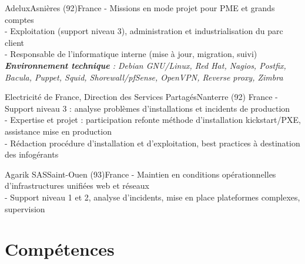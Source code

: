 \documentclass[10pt,a4paper]{moderncv}
\begin{document}
{Adelux}{Asnières (92)}{France}
{
- Missions en mode projet pour PME et grands comptes\\
- Exploitation (support niveau 3), administration et industrialisation du parc
client\\
- Responsable de l'informatique interne (mise à jour, migration, suivi)\\
\textit{\textbf{Environnement technique} : Debian GNU/Linux, Red Hat, Nagios, Postfix, Bacula, Puppet, Squid, Shorewall/pfSense, OpenVPN, Reverse proxy, Zimbra}
\newline{}
}

{Electricité de France, Direction des Services Partagés}{Nanterre (92)}
{France}
{
- Support niveau 3 : analyse problèmes d'installations et incidents de production\\
- Expertise et projet : participation refonte méthode d'installation kickstart/PXE,
assistance mise en production\\
- Rédaction procédure d'installation et d'exploitation, best practices à
destination des infogérants
\newline{}
}

{Agarik SAS}{Saint-Ouen (93)}{France}
{
- Maintien en conditions opérationnelles d'infrastructures unifiées web et
réseaux\\
- Support niveau 1 et 2, analyse d'incidents, mise en place plateformes
complexes, supervision
\newline{}}

\section{Compétences}
\end{document}
